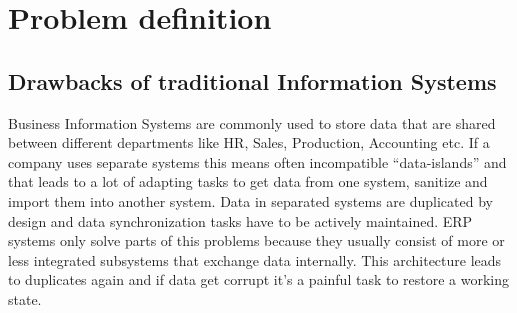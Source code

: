 
\renewcommand{\thefigure}{\arabic{figure}}
\captionsetup{width=0.8\textwidth}




\section*{Problem definition}

\subsection*{Drawbacks of traditional Information Systems}

Business Information Systems are commonly used to store data that are shared between different departments like HR, Sales, Production, Accounting etc.
If a company uses separate systems this means often incompatible ``data-islands'' and that leads to a lot of adapting tasks to get data from one system, sanitize and import them into another system.
Data in separated systems are duplicated by design and data synchronization tasks have to be actively maintained.
ERP systems only solve parts of this problems because they usually consist of more or less integrated subsystems that exchange data internally.
This architecture leads to duplicates again and if data get corrupt it's a painful task to restore a working state.


